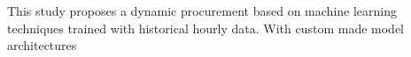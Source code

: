

This study proposes a dynamic procurement based on machine learning techniques trained with historical hourly data. With custom made model architectures








